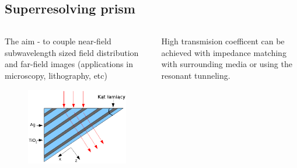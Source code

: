 \documentclass{beamer}
\begin{document}
\subsection{Superresolving prism}
\begin{frame}
	\begin{columns}
		\begin{column}{0.5\textwidth}
			The aim - to couple near-field subwavelength sized field distribution and far-field images (applications in microscopy, lithography, etc)
			\begin{figure}
				\includegraphics[width=\textwidth]{../images/multilayer/prism.png}
			\end{figure}
		\end{column}
		\begin{column}{0.5\textwidth}
		High transmision coefficent can be achieved with impedance matching with surrounding media or using the resonant tunneling.

			{\tiny \cite{scalora-transparentmetal}}
		\end{column}
	\end{columns}
		
\end{frame}
\end{document}
